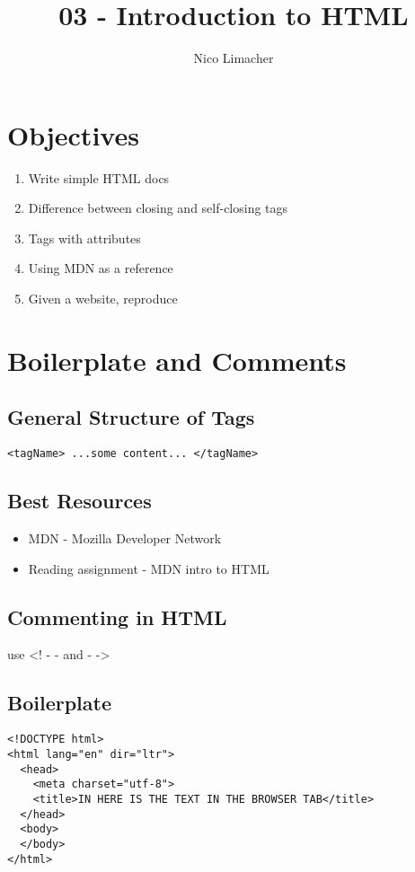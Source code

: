 \documentclass{article}
\begin{document}
	
	\title{03 - Introduction to HTML}
	\author{Nico Limacher}
	
\maketitle


\section{Objectives}
\begin{enumerate}
	\itemsep0em
	\item Write simple HTML docs
	\item Difference between closing and self-closing tags
	\item Tags with attributes
	\item Using MDN as a reference
	\item Given a website, reproduce
\end{enumerate}

\section{Boilerplate and Comments}
\subsection{General Structure of Tags}
\begin{verbatim}
<tagName> ...some content... </tagName>
\end{verbatim}

\subsection{Best Resources}
\begin{itemize}
	\itemsep0em
	\item MDN - Mozilla Developer Network
	\item Reading assignment - MDN intro to HTML
\end{itemize}

\subsection{Commenting in HTML}
use <! - - and - ->

\subsection{Boilerplate}
\begin{verbatim}
<!DOCTYPE html>
<html lang="en" dir="ltr">
  <head>
    <meta charset="utf-8">
    <title>IN HERE IS THE TEXT IN THE BROWSER TAB</title>
  </head>
  <body>
  </body>
</html>
\end{verbatim}
\end{document}

